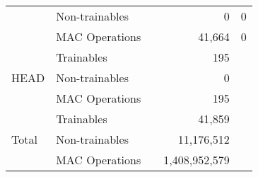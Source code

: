 \begin{table}[h]
\begin{tabular}{|l|l|r|r|r|}
                        &Non-trainables         &               &0              &0          \\\cline{2-\numColumns}
                        &MAC Operations         &               &41,664         &0          \\\hline                        
\multirow{3}{*}{HEAD}   &Trainables             &               &195            &           \\\cline{2-\numColumns}
                        &Non-trainables         &               &0              &           \\\cline{2-\numColumns}
                        &MAC Operations         &               &195            &           \\\hline\hline
\multirow{3}{*}{Total}  &Trainables             &               &41,859         &           \\\cline{2-\numColumns}
                        &Non-trainables         &               &11,176,512     &           \\\cline{2-\numColumns}
                        &MAC Operations         &               &1,408,952,579  &           \\\hline

    \end{tabular}
\end{table}

